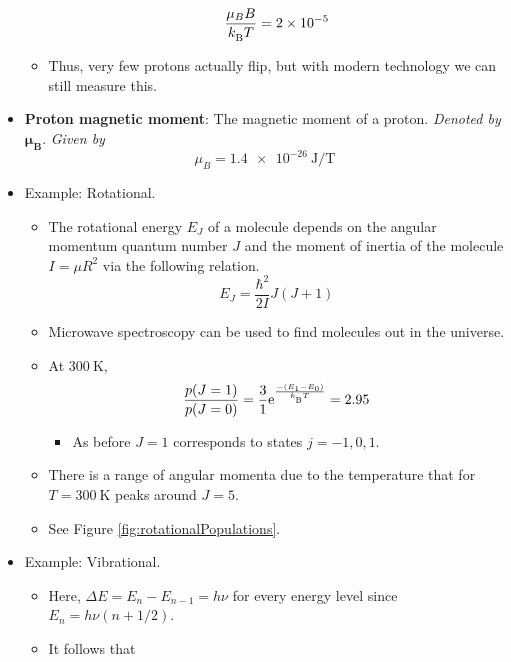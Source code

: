 \documentclass[../notes.tex]{subfiles}
\begin{document}
\begin{itemize}
\begin{itemize}
        \begin{equation*}
            \frac{\mu_BB}{\kB T} = \num{2e-5}
        \end{equation*}
        \item Thus, very few protons actually flip, but with modern technology we can still measure this.
    \end{itemize}
    \item \textbf{Proton magnetic moment}: The magnetic moment of a proton. \emph{Denoted by} $\bm{\mu_B}$. \emph{Given by}
    \begin{equation*}
        \mu_B = \SI[per-mode=symbol]{1.4e-26}{\joule\per\tesla}
    \end{equation*}
    \item Example: Rotational.
    \begin{itemize}
        \item The rotational energy $E_J$ of a molecule depends on the angular momentum quantum number $J$ and the moment of inertia of the molecule $I=\mu R^2$ via the following relation.
        \begin{equation*}
            E_J = \frac{\hbar^2}{2I}J(J+1)
        \end{equation*}
        \item Microwave spectroscopy can be used to find molecules out in the universe.
        \item At $\SI{300}{\kelvin}$,
        \begin{equation*}
            \frac{p(J=1)}{p(J=0)} = \frac{3}{1}\e[\frac{-(E_1-E_0)}{\kB T}] = 2.95
        \end{equation*}
        \begin{itemize}
            \item As before $J=1$ corresponds to states $j=-1,0,1$.
        \end{itemize}
        \item There is a range of angular momenta due to the temperature that for $T=\SI{300}{\kelvin}$ peaks around $J=5$.
        \item See Figure \ref{fig:rotationalPopulations}.
    \end{itemize}
    \item Example: Vibrational.
    \begin{itemize}
        \item Here, $\Delta E=E_n-E_{n-1}=h\nu$ for every energy level since $E_n=h\nu(n+1/2)$.
        \item It follows that
        \begin{equation*}

\end{equation*}
\end{itemize}
\end{itemize}
\end{document}
